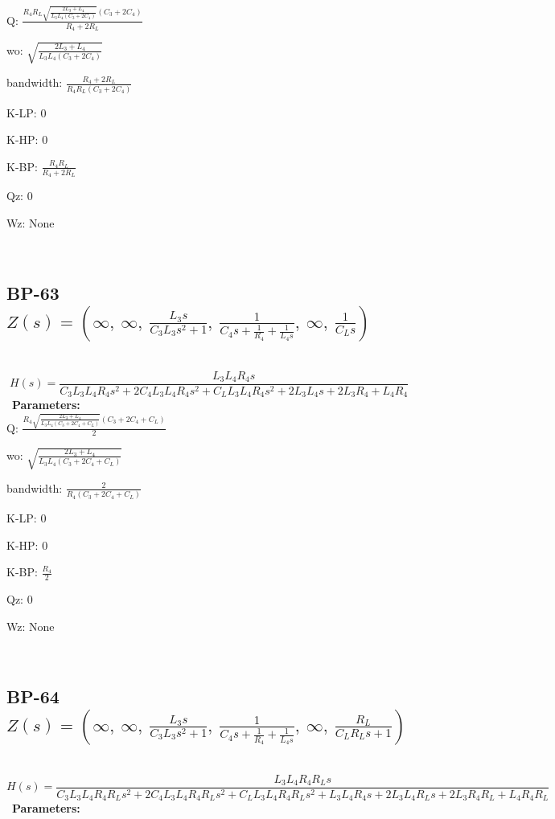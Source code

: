 \documentclass{article}
\begin{document}
Q: $\frac{R_{4} R_{L} \sqrt{\frac{2 L_{3} + L_{4}}{L_{3} L_{4} \left(C_{3} + 2 C_{4}\right)}} \left(C_{3} + 2 C_{4}\right)}{R_{4} + 2 R_{L}}$\ 

wo: $\sqrt{\frac{2 L_{3} + L_{4}}{L_{3} L_{4} \left(C_{3} + 2 C_{4}\right)}}$\ 

bandwidth: $\frac{R_{4} + 2 R_{L}}{R_{4} R_{L} \left(C_{3} + 2 C_{4}\right)}$\ 

K-LP: $0$\ 

K-HP: $0$\ 

K-BP: $\frac{R_{4} R_{L}}{R_{4} + 2 R_{L}}$\ 

Qz: $0$\ 

Wz: $\text{None}$\ 

\ 

\subsection{BP-63 $Z(s) = \left( \infty, \  \infty, \  \frac{L_{3} s}{C_{3} L_{3} s^{2} + 1}, \  \frac{1}{C_{4} s + \frac{1}{R_{4}} + \frac{1}{L_{4} s}}, \  \infty, \  \frac{1}{C_{L} s}\right)$ } \ 
\textbf{\[H(s) = \frac{L_{3} L_{4} R_{4} s}{C_{3} L_{3} L_{4} R_{4} s^{2} + 2 C_{4} L_{3} L_{4} R_{4} s^{2} + C_{L} L_{3} L_{4} R_{4} s^{2} + 2 L_{3} L_{4} s + 2 L_{3} R_{4} + L_{4} R_{4}}\] } \ 
\textbf{Parameters:}\\ 

Q: $\frac{R_{4} \sqrt{\frac{2 L_{3} + L_{4}}{L_{3} L_{4} \left(C_{3} + 2 C_{4} + C_{L}\right)}} \left(C_{3} + 2 C_{4} + C_{L}\right)}{2}$\ 

wo: $\sqrt{\frac{2 L_{3} + L_{4}}{L_{3} L_{4} \left(C_{3} + 2 C_{4} + C_{L}\right)}}$\ 

bandwidth: $\frac{2}{R_{4} \left(C_{3} + 2 C_{4} + C_{L}\right)}$\ 

K-LP: $0$\ 

K-HP: $0$\ 

K-BP: $\frac{R_{4}}{2}$\ 

Qz: $0$\ 

Wz: $\text{None}$\ 

\ 

\subsection{BP-64 $Z(s) = \left( \infty, \  \infty, \  \frac{L_{3} s}{C_{3} L_{3} s^{2} + 1}, \  \frac{1}{C_{4} s + \frac{1}{R_{4}} + \frac{1}{L_{4} s}}, \  \infty, \  \frac{R_{L}}{C_{L} R_{L} s + 1}\right)$ } \ 
\textbf{\[H(s) = \frac{L_{3} L_{4} R_{4} R_{L} s}{C_{3} L_{3} L_{4} R_{4} R_{L} s^{2} + 2 C_{4} L_{3} L_{4} R_{4} R_{L} s^{2} + C_{L} L_{3} L_{4} R_{4} R_{L} s^{2} + L_{3} L_{4} R_{4} s + 2 L_{3} L_{4} R_{L} s + 2 L_{3} R_{4} R_{L} + L_{4} R_{4} R_{L}}\] } \ 
\textbf{Parameters:}\\ 
\end{document}
